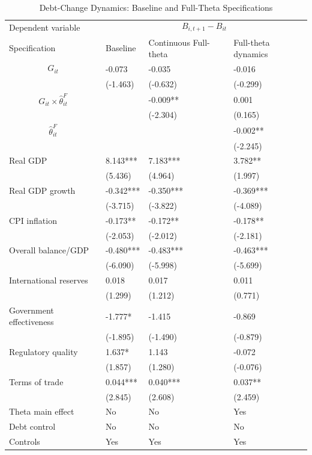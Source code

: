 \begin{table}[H]\centering
\begin{threeparttable}
\caption{Debt-Change Dynamics: Baseline and Full-Theta Specifications}
\label{tab:debt_change_combined_fulltheta}
\scriptsize
\begin{tabularx}{\textwidth}{lYYY}
\toprule
Dependent variable &  \\
\cmidrule(lr){2-4}
Specification & Baseline & Continuous Full-theta & Full-theta dynamics \\
\midrule
$$G_{it}$$ & -0.073 & -0.035 & -0.016 \\
 & (-1.463) & (-0.632) & (-0.299) \\
$$G_{it}\times\widehat{\theta}^{F}_{it}$$ &  & -0.009** & 0.001 \\
 &  & (-2.304) & (0.165) \\
$$\widehat{\theta}^{F}_{it}$$ &  &  & -0.002** \\
 &  &  & (-2.245) \\
Real GDP & 8.143*** & 7.183*** & 3.782** \\
 & (5.436) & (4.964) & (1.997) \\
Real GDP growth & -0.342*** & -0.350*** & -0.369*** \\
 & (-3.715) & (-3.822) & (-4.089) \\
CPI inflation & -0.173** & -0.172** & -0.178** \\
 & (-2.053) & (-2.012) & (-2.181) \\
Overall balance/GDP & -0.480*** & -0.483*** & -0.463*** \\
 & (-6.090) & (-5.998) & (-5.699) \\
International reserves & 0.018 & 0.017 & 0.011 \\
 & (1.299) & (1.212) & (0.771) \\
Government effectiveness & -1.777* & -1.415 & -0.869 \\
 & (-1.895) & (-1.490) & (-0.879) \\
Regulatory quality & 1.637* & 1.143 & -0.072 \\
 & (1.857) & (1.280) & (-0.076) \\
Terms of trade & 0.044*** & 0.040*** & 0.037** \\
 & (2.845) & (2.608) & (2.459) \\
\midrule
Theta main effect & No & No & Yes \\
Debt control & No & No & No \\
Controls & Yes & Yes & Yes \\

\end{tabularx}
\end{threeparttable}
\end{table}
